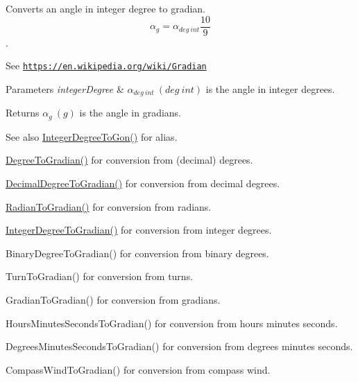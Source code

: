 Converts an angle in integer degree to gradian. \[\alpha_{g}=\alpha_{deg\ int}\frac{10}{9}\]. 

See \href{https://en.wikipedia.org/wiki/Gradian}{\tt https\+://en.\+wikipedia.\+org/wiki/\+Gradian} 
\begin{DoxyParams}{Parameters}
{\em integer\+Degree} & $\alpha_{deg\ int}\ (deg\ int)$ is the angle in integer degrees. \\
\hline
\end{DoxyParams}
\begin{DoxyReturn}{Returns}
$\alpha_{g}\ (g)$ is the angle in gradians. 
\end{DoxyReturn}
\begin{DoxySeeAlso}{See also}
\mbox{\hyperlink{group___e_g_x_math-_angle_conversions-_integer_degree_ga6e5be425c37ad27319f09329156c64bb}{Integer\+Degree\+To\+Gon()}} for alias. 

\mbox{\hyperlink{group___e_g_x_math-_angle_conversions-_degree_ga25bb5506b3f66fff7a1b85bf7bd795b3}{Degree\+To\+Gradian()}} for conversion from (decimal) degrees. 

\mbox{\hyperlink{group___e_g_x_math-_angle_conversions-_decimal_degree_ga3ac6f1ceb36a4938cdf3b55554734c99}{Decimal\+Degree\+To\+Gradian()}} for conversion from decimal degrees. 

\mbox{\hyperlink{group___e_g_x_math-_angle_conversions-_radian_ga3c1607eae50cbf0186c42485bb3878d5}{Radian\+To\+Gradian()}} for conversion from radians. 

\mbox{\hyperlink{group___e_g_x_math-_angle_conversions-_integer_degree_ga47127467ff7a8ef57f6be9ce496a97df}{Integer\+Degree\+To\+Gradian()}} for conversion from integer degrees. 

Binary\+Degree\+To\+Gradian() for conversion from binary degrees. 

Turn\+To\+Gradian() for conversion from turns. 

Gradian\+To\+Gradian() for conversion from gradians. 

Hours\+Minutes\+Seconds\+To\+Gradian() for conversion from hours minutes seconds. 

Degrees\+Minutes\+Seconds\+To\+Gradian() for conversion from degrees minutes seconds. 

Compass\+Wind\+To\+Gradian() for conversion from compass wind. 
\end{DoxySeeAlso}
\mbox{\label{group___e_g_x_math-_angle_conversions-_integer_degree_gae6b79bd5a92f8c6942b9fc2c50695e6a}} 
